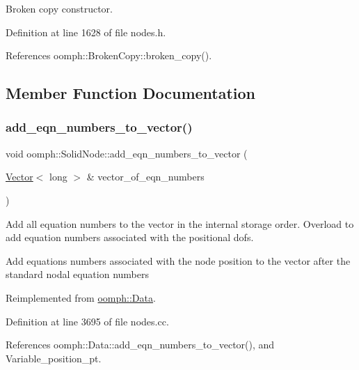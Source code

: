 Broken copy constructor. 



Definition at line 1628 of file nodes.\+h.



References oomph\+::\+Broken\+Copy\+::broken\+\_\+copy().



\subsection{Member Function Documentation}
\mbox{\label{classoomph_1_1SolidNode_ad875a778d7d3bc32a847d93f6698bce4}} 
\subsubsection{\texorpdfstring{add\+\_\+eqn\+\_\+numbers\+\_\+to\+\_\+vector()}{add\_eqn\_numbers\_to\_vector()}}
{\footnotesize\ttfamily void oomph\+::\+Solid\+Node\+::add\+\_\+eqn\+\_\+numbers\+\_\+to\+\_\+vector (\begin{DoxyParamCaption}\item[{\hyperlink{classoomph_1_1Vector}{Vector}$<$ long $>$ \&}]{vector\+\_\+of\+\_\+eqn\+\_\+numbers }\end{DoxyParamCaption})\hspace{0.3cm}{\ttfamily [virtual]}}



Add all equation numbers to the vector in the internal storage order. Overload to add equation numbers associated with the positional dofs. 

Add equations numbers associated with the node position to the vector after the standard nodal equation numbers 

Reimplemented from \hyperlink{classoomph_1_1Data_a1d3f7c4200506d11fea3c647fe498f5d}{oomph\+::\+Data}.



Definition at line 3695 of file nodes.\+cc.



References oomph\+::\+Data\+::add\+\_\+eqn\+\_\+numbers\+\_\+to\+\_\+vector(), and Variable\+\_\+position\+\_\+pt.

